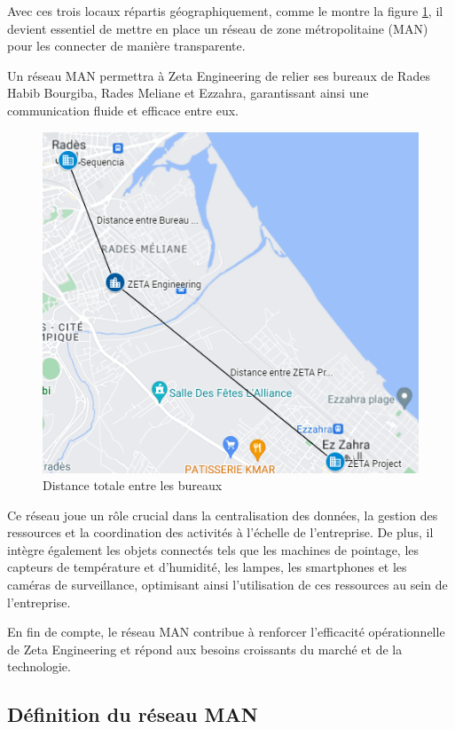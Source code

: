 Avec ces trois locaux répartis géographiquement, comme le montre la figure \ref{Chap2.6.0}, il devient essentiel de mettre en place un réseau de zone métropolitaine (MAN) pour les connecter de manière transparente. 

Un réseau MAN permettra à Zeta Engineering de relier ses bureaux de Rades Habib Bourgiba, Rades Meliane et Ezzahra, garantissant ainsi une communication fluide et efficace entre eux.

\begin{figure}[H]
\centering
\includegraphics[width=16cm]{Images/DistanceTotal.png}
\caption{Distance totale entre les bureaux}
\label{Chap2.6.0}
\end{figure}

Ce réseau joue un rôle crucial dans la centralisation des données, la gestion des ressources et la coordination des activités à l'échelle de l'entreprise. De plus, il intègre également les objets connectés tels que les machines de pointage, les capteurs de température et d'humidité, les lampes, les smartphones et les caméras de surveillance, optimisant ainsi l'utilisation de ces ressources au sein de l'entreprise. 

En fin de compte, le réseau MAN contribue à renforcer l'efficacité opérationnelle de Zeta Engineering et répond aux besoins croissants du marché et de la technologie.


\subsection{Définition du réseau MAN}

